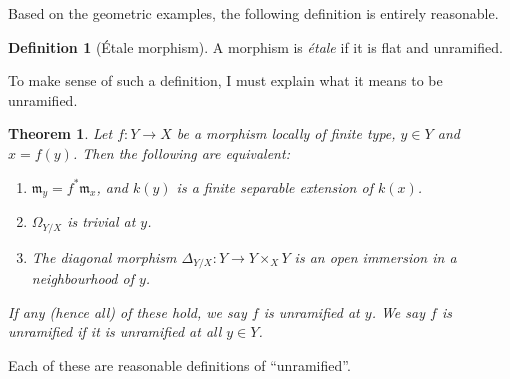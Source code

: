 \documentclass{shortart}
\newtheorem*{thm}{Theorem}
\theoremstyle{definition}
\newtheorem*{defi}{Definition}
\begin{document}
Based on the geometric examples, the following definition is entirely reasonable.
\begin{defi}[\'Etale morphism]
  A morphism is \emph{\'etale} if it is flat and unramified.
\end{defi}
To make sense of such a definition, I must explain what it means to be unramified.
\begin{thm}
  Let $f: Y \to X$ be a morphism locally of finite type, $y \in Y$ and $x = f(y)$. Then the following are equivalent:
  \begin{enumerate}
    \item $\mathfrak{m}_y = f^*\mathfrak{m}_x$, and $k(y)$ is a finite separable extension of $k(x)$.
    \item $\Omega_{Y/X}$ is trivial at $y$.
    \item The diagonal morphism $\Delta_{Y/X}: Y \to Y \times_X Y$ is an open immersion in a neighbourhood of $y$.
  \end{enumerate}
  If any (hence all) of these hold, we say $f$ is \emph{unramified} at $y$. We say $f$ is \emph{unramified} if it is unramified at all $y \in Y$.
\end{thm}
Each of these are reasonable definitions of ``unramified''.
\end{document}

